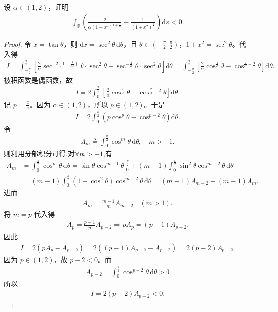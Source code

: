 \documentclass[../../main.tex]{subfiles}%
\begin{document}
\begin{example}
设 $\alpha\in(1,2)$，证明
\begin{align*}
\int_{\mathbb{R}}\left(\frac{2}{\alpha(1+x^2)^{1+\frac{1}{\alpha}}}-\frac{1}{(1+x^2)^{\frac{1}{\alpha}}}\right)\mathrm{d}x<0.
\end{align*}
\end{example}
\begin{proof}
令 $x=\tan\theta$，则 $\mathrm{d}x=\sec^2\theta\,\mathrm{d}\theta$，且 $\theta\in(-\frac{\pi}{2},\frac{\pi}{2})$，$1+x^2=\sec^2\theta$。代入得
\begin{align*}
I=\int_{-\frac{\pi}{2}}^{\frac{\pi}{2}}\left[\frac{2}{\alpha}\sec^{-2(1+\frac{1}{\alpha})}\theta\cdot\sec^2\theta-\sec^{-\frac{2}{\alpha}}\theta\cdot\sec^2\theta\right]\mathrm{d}\theta 
=\int_{-\frac{\pi}{2}}^{\frac{\pi}{2}}\left[\frac{2}{\alpha}\cos^{\frac{2}{\alpha}}\theta-\cos^{\frac{2}{\alpha}-2}\theta\right]\mathrm{d}\theta.
\end{align*}
被积函数是偶函数，故
\begin{align*}
I=2\int_0^{\frac{\pi}{2}}\left[\frac{2}{\alpha}\cos^{\frac{2}{\alpha}}\theta-\cos^{\frac{2}{\alpha}-2}\theta\right]\mathrm{d}\theta.
\end{align*}
记 $p=\frac{2}{\alpha}$。因为 $\alpha\in(1,2)$，所以 $p\in(1,2)$。于是
\begin{align*}
I=2\int_0^{\frac{\pi}{2}}\left(p\cos^p\theta-\cos^{p-2}\theta\right)\mathrm{d}\theta.
\end{align*}
令
\begin{align*}
A_m\triangleq \int_0^{\frac{\pi}{2}}\cos^m\theta\,\mathrm{d}\theta,\quad m>-1.
\end{align*}
则利用分部积分可得,对$\forall m>-1$,有
\begin{align*}
A_m&=\int_0^{\frac{\pi}{2}}{\cos ^m\theta \,\mathrm{d}\theta}=\sin \theta \cos ^{m-1}\theta \Big |_{0}^{\frac{\pi}{2}}+\left( m-1 \right) \int_0^{\frac{\pi}{2}}{\sin ^2\theta \cos ^{m-2}\theta \,\mathrm{d}\theta}
\\
&=\left( m-1 \right) \int_0^{\frac{\pi}{2}}{\left( 1-\cos ^2\theta \right) \cos ^{m-2}\theta \,\mathrm{d}\theta}=\left( m-1 \right) A_{m-2}-\left( m-1 \right) A_m.
\end{align*}
进而
\begin{align*}
A_m=\frac{m-1}{m}A_{m-2}\quad \left( m>1 \right) .
\end{align*}
将 $m=p$ 代入得
\begin{align*}
A_p=\frac{p-1}{p}A_{p-2}\Longrightarrow pA_p=(p-1)A_{p-2}.
\end{align*}
因此
\begin{align*}
I=2\left(pA_p-A_{p-2}\right)
=2\left((p-1)A_{p-2}-A_{p-2}\right) =2(p-2)A_{p-2}.
\end{align*}
因为 $p\in(1,2)$，故 $p-2<0$。而
\begin{align*}
A_{p-2}=\int_0^{\frac{\pi}{2}}\cos^{p-2}\theta\,\mathrm{d}\theta>0
\end{align*}
所以
\begin{align*}
I=2(p-2)A_{p-2}<0.
\end{align*}
\end{proof}
\end{document}
